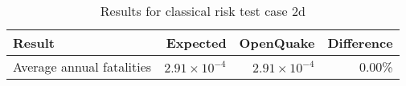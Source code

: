 \begin{table}[htbp]

\centering
\begin{tabular}{ l r r r }

\hline
\rowcolor{anti-flashwhite}
\bf{Result} & \bf{Expected} & \bf{OpenQuake} & \bf{Difference}\\
\hline
Average annual fatalities & $2.91 \times 10^{-4}$ & $2.91 \times 10^{-4}$ & 0.00\% \\
\hline
\end{tabular}

\caption{Results for classical risk test case 2d}
\label{tab:result-cr-2d}
\end{table}